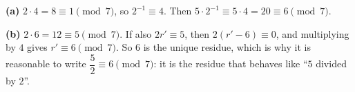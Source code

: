 \textbf{(a)} $2\cdot4=8\equiv1\pmod7$, so $2^{-1}\equiv4$. Then $5\cdot2^{-1}\equiv5\cdot4=20\equiv\boxed{6}\pmod7$.

\textbf{(b)} $2\cdot6=12\equiv5\pmod7$. If also $2r'\equiv5$, then $2(r'-6)\equiv0$, and multiplying by $4$ gives $r'\equiv6\pmod7$. So $6$ is the unique residue, which is why it is reasonable to write $\dfrac52\equiv6\pmod7$: it is the residue that behaves like ``$5$ divided by $2$''.
